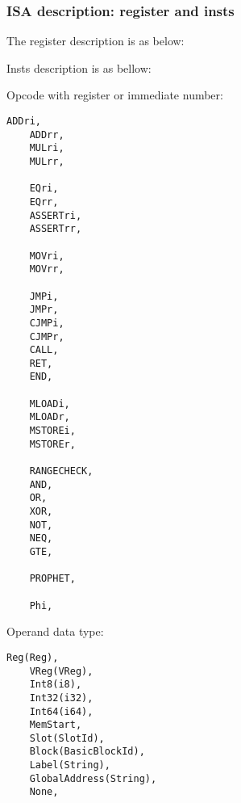 \subsubsection{ISA description: register and insts}

The register description is as below:
\begin{table}[!ht]
    \caption{Register Description}
    \label{table:register-description}
\end{table}

Insts description is as bellow:

Opcode with register or immediate number:
\begin{lstlisting}[language={}]
    ADDri,
    ADDrr,
    MULri,
    MULrr,

    EQri,
    EQrr,
    ASSERTri,
    ASSERTrr,

    MOVri,
    MOVrr,

    JMPi,
    JMPr,
    CJMPi,
    CJMPr,
    CALL,
    RET,
    END,

    MLOADi,
    MLOADr,
    MSTOREi,
    MSTOREr,

    RANGECHECK,
    AND,
    OR,
    XOR,
    NOT,
    NEQ,
    GTE,

    PROPHET,

    Phi,
\end{lstlisting}

Operand data type:
\begin{lstlisting}[language={}]
    Reg(Reg),
    VReg(VReg),
    Int8(i8),
    Int32(i32),
    Int64(i64),
    MemStart,
    Slot(SlotId),
    Block(BasicBlockId),
    Label(String),
    GlobalAddress(String),
    None,
\end{lstlisting}